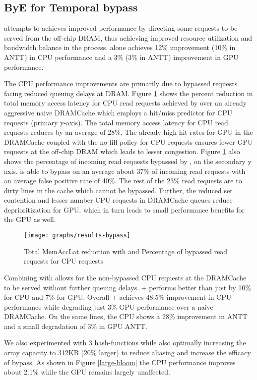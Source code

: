 \subsection{ByE for Temporal bypass}
\bypassname attempts to achieves improved performance by directing some requests to be served from the off-chip DRAM, thus achieving improved resource utilization and bandwidth balance in the process. \bypassname alone achieves 12\% improvement (10\% in ANTT) in CPU performance and a 3\% (3\% in ANTT) improvement in GPU performance. 
\par The CPU performance improvements are primarily due to bypassed requests facing reduced queuing delays at DRAM. Figure \ref{results-bloom} shows the percent reduction in total memory access latency for CPU read requests achieved by \bypassname over an already aggressive naive DRAMCache which employs a hit/miss predictor for CPU requests (primary y-axis). The total memory access latency for CPU read requests reduces by an average of 28\%. The already high hit rates for GPU in the DRAMCache coupled with the no-fill policy for CPU requests ensures fewer GPU requests at the off-chip DRAM which leads to lesser congestion. Figure \ref{results-bloom} also shows the percentage of incoming read requests bypassed by \bypassname, on the secondary y axis. \bypassname is able to bypass on an average about 37\% of incoming read requests with an average false positive rate of 40\%. The rest of the 23\% read requests are to dirty lines in the cache which cannot be bypassed. Further, the reduced set contention and lesser number CPU requests in DRAMCache queues reduce deprioritization for GPU, which in turn leads to small performance benefits for the GPU as well.

\begin{figure}[!htb]
    \centering
    \texttt{[image: graphs/results-bypass]}
    \caption{Total MemAccLat reduction with \bypassname and Percentage of bypassed read requests for CPU requests}
    \label{results-bloom}
\end{figure}

\par Combining \bypassname with \prioname allows for the non-bypassed CPU requests at the DRAMCache to be served without further queuing delays. \bypassname + \prioname performs better than just \prioname by 10\% for CPU and 7\% for GPU. Overall \bypassname + \prioname achieves 48.5\% improvement in CPU performance while degrading just 3\% GPU performance over a naive DRAMCache. On the same lines, the CPU shows a 28\% improvement in ANTT and a small degradation of 3\% in GPU ANTT. 
\par We also experimented with 3 hash-functions while also optimally increasing the array capacity to 312KB (20\% larger) to reduce aliasing and increase the efficacy of bypass. As shown in Figure \ref{large-bloom} the CPU performance improves about 2.1\% while the GPU remains largely unaffected.

